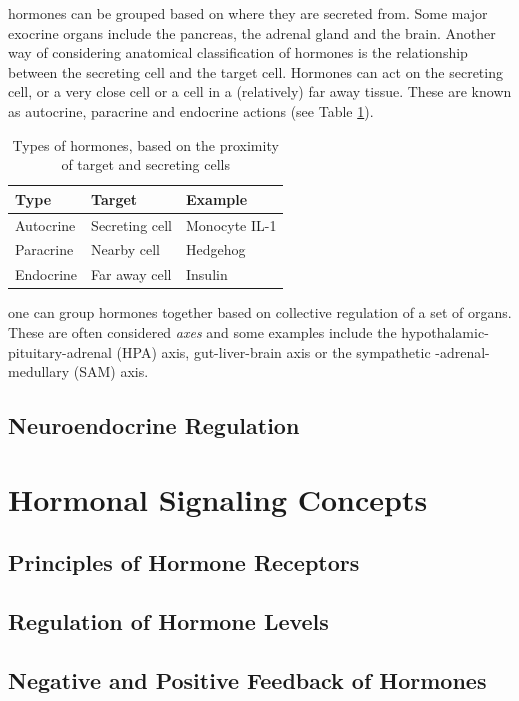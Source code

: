 \documentclass{tufte-handout}
\begin{document}
 hormones can be grouped based on where they are secreted from.  Some major exocrine organs include the pancreas, the adrenal gland and the brain.  Another way of considering anatomical classification of hormones is the relationship between the secreting cell and the target cell.  Hormones can act on the secreting cell, or a very close cell or a cell in a (relatively) far away tissue.  These are known as autocrine, paracrine and endocrine actions (see Table \ref{tab:hormone-classification}).

\begin{table}
  \centering
  \begin{tabular}{lll}
    \toprule
    Type & Target & Example \\
    \midrule
    Autocrine & Secreting cell & Monocyte IL-1\\
    Paracrine & Nearby cell & Hedgehog \\
    Endocrine & Far away cell & Insulin \\
    \bottomrule
  \end{tabular}
  \caption{Types of hormones, based on the proximity of target and secreting cells}
  \label{tab:hormone-classification}
\end{table}

 one can group hormones together based on collective regulation  of a set of organs.  These are often considered \emph{axes} and some examples include the hypothalamic-pituitary-adrenal (HPA) axis, gut-liver-brain axis or the sympathetic -adrenal-medullary (SAM) axis. 

\subsection{Neuroendocrine Regulation}
\section{Hormonal Signaling Concepts}
\subsection{Principles of Hormone Receptors}
\subsection{Regulation of Hormone Levels}
\subsection{Negative and Positive Feedback of Hormones}



\end{document}

